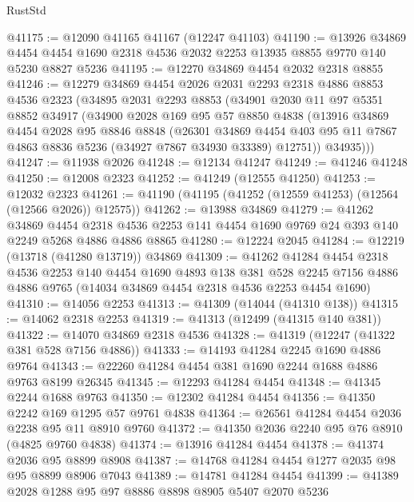 \begin{lexlean}{RustStd}
\begin{coremodule}
@41175 := @12090 @41165 @41167 (@12247 @41103)
@41190 := @13926
    @34869
    @4454
    @4454
    @1690
    @2318
    @4536
    @2032
    @2253
    @13935
    @8855
    @9770
    @140
    @5230
    @8827
    @5236
@41195 := @12270 @34869 @4454 @2032 @2318 @8855
@41246 := @12279
    @34869
    @4454
    @2026
    @2031
    @2293
    @2318
    @4886
    @8853
    @4536
    @2323
    (@34895
      @2031
      @2293
      @8853
      (@34901
        @2030
        @11
        @97
        @5351
        @8852
        @34917
        (@34900
          @2028
          @169
          @95
          @57
          @8850
          @4838
          (@13916
            @34869
            @4454
            @2028
            @95
            @8846
            @8848
            (@26301
              @34869
              @4454
              @403
              @95
              @11
              @7867
              @4863
              @8836
              @5236
              (@34927 @7867 @34930 @33389)
              @12751))
          @34935)))
@41247 := @11938 @2026
@41248 := @12134 @41247
@41249 := @41246 @41248
@41250 := @12008 @2323
@41252 := @41249 (@12555 @41250)
@41253 := @12032 @2323
@41261 := @41190 (@41195 (@41252 (@12559 @41253) (@12564 (@12566 @2026)) @12575))
@41262 := @13988 @34869
@41279 := @41262
    @34869
    @4454
    @2318
    @4536
    @2253
    @141
    @4454
    @1690
    @9769
    @24
    @393
    @140
    @2249
    @5268
    @4886
    @4886
    @8865
@41280 := @12224 @2045
@41284 := @12219 (@13718 (@41280 @13719)) @34869
@41309 := @41262
    @41284
    @4454
    @2318
    @4536
    @2253
    @140
    @4454
    @1690
    @4893
    @138
    @381
    @528
    @2245
    @7156
    @4886
    @4886
    @9765
    (@14034 @34869 @4454 @2318 @4536 @2253 @4454 @1690)
@41310 := @14056 @2253
@41313 := @41309 (@14044 (@41310 @138))
@41315 := @14062 @2318 @2253
@41319 := @41313 (@12499 (@41315 @140 @381))
@41322 := @14070 @34869 @2318 @4536
@41328 := @41319 (@12247 (@41322 @381 @528 @7156 @4886))
@41333 := @14193 @41284 @2245 @1690 @4886 @9764
@41343 := @22260 @41284 @4454 @381 @1690 @2244 @1688 @4886 @9763 @8199 @26345
@41345 := @12293 @41284 @4454
@41348 := @41345 @2244 @1688 @9763
@41350 := @12302 @41284 @4454
@41356 := @41350 @2242 @169 @1295 @57 @9761 @4838
@41364 := @26561 @41284 @4454 @2036 @2238 @95 @11 @8910 @9760
@41372 := @41350 @2036 @2240 @95 @76 @8910 (@4825 @9760 @4838)
@41374 := @13916 @41284 @4454
@41378 := @41374 @2036 @95 @8899 @8908
@41387 := @14768 @41284 @4454 @1277 @2035 @98 @95 @8899 @8906 @7043
@41389 := @14781 @41284 @4454
@41399 := @41389 @2028 @1288 @95 @97 @8886 @8898 @8905 @5407 @2070 @5236

\end{coremodule}
\end{lexlean}
